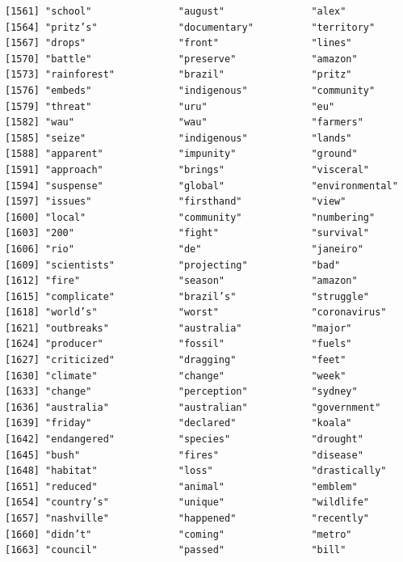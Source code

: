 \documentclass[
  letterpaper,
  DIV=11,
  numbers=noendperiod]{scrartcl}
\begin{document}
\begin{verbatim}
[1561] "school"               "august"               "alex"                
[1564] "pritz’s"              "documentary"          "territory"           
[1567] "drops"                "front"                "lines"               
[1570] "battle"               "preserve"             "amazon"              
[1573] "rainforest"           "brazil"               "pritz"               
[1576] "embeds"               "indigenous"           "community"           
[1579] "threat"               "uru"                  "eu"                  
[1582] "wau"                  "wau"                  "farmers"             
[1585] "seize"                "indigenous"           "lands"               
[1588] "apparent"             "impunity"             "ground"              
[1591] "approach"             "brings"               "visceral"            
[1594] "suspense"             "global"               "environmental"       
[1597] "issues"               "firsthand"            "view"                
[1600] "local"                "community"            "numbering"           
[1603] "200"                  "fight"                "survival"            
[1606] "rio"                  "de"                   "janeiro"             
[1609] "scientists"           "projecting"           "bad"                 
[1612] "fire"                 "season"               "amazon"              
[1615] "complicate"           "brazil’s"             "struggle"            
[1618] "world’s"              "worst"                "coronavirus"         
[1621] "outbreaks"            "australia"            "major"               
[1624] "producer"             "fossil"               "fuels"               
[1627] "criticized"           "dragging"             "feet"                
[1630] "climate"              "change"               "week"                
[1633] "change"               "perception"           "sydney"              
[1636] "australia"            "australian"           "government"          
[1639] "friday"               "declared"             "koala"               
[1642] "endangered"           "species"              "drought"             
[1645] "bush"                 "fires"                "disease"             
[1648] "habitat"              "loss"                 "drastically"         
[1651] "reduced"              "animal"               "emblem"              
[1654] "country’s"            "unique"               "wildlife"            
[1657] "nashville"            "happened"             "recently"            
[1660] "didn’t"               "coming"               "metro"               
[1663] "council"              "passed"               "bill"                

\end{verbatim}
\end{document}

